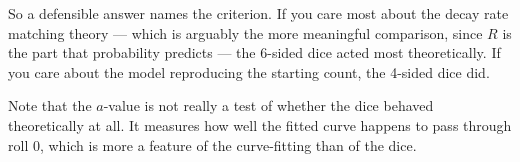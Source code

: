 \documentclass[12pt]{ximera}
\begin{document}
\begin{problem}
\begin{solution}
So a defensible answer names the criterion. If you care most about the decay rate matching
theory --- which is arguably the more meaningful comparison, since $R$ is the part that
probability predicts --- the 6-sided dice acted most theoretically. If you care about the
model reproducing the starting count, the 4-sided dice did.

Note that the $a$-value is not really a test of whether the dice behaved theoretically at
all. It measures how well the fitted curve happens to pass through roll 0, which is more a
feature of the curve-fitting than of the dice.
\end{solution}
\end{problem}
\end{document}
